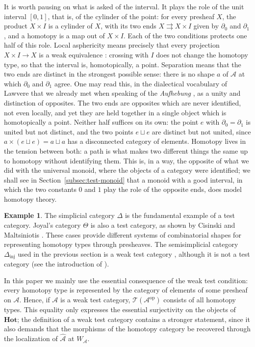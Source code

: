 \documentclass[11pt]{amsart}
\theoremstyle{definition}
\newtheorem{example}[teo]{Example}
\theoremstyle{remark}
\numberwithin{figure}{section}%
\newcommand{\T}{\mathcal{T}}
\newcommand{\Hot}{\mathbf{Hot}}
\newcommand{\Dinj}{\Delta_{\mathrm{inj}}}
\newcommand{\op}{\mathrm{op}}
\newcommand{\A}{\mathcal{A}}
\begin{document}
It is worth pausing on what is asked of the interval. It plays the role of the unit interval $[0,1]$, that is, of the cylinder of the point: for every presheaf $X$, the product $X\times I$ is a cylinder of $X$, with its two ends $X\rightrightarrows X\times I$ given by $\partial_0$ and $\partial_1$, and a homotopy is a map out of $X\times I$. Each of the two conditions protects one half of this role. Local asphericity means precisely that every projection $X\times I\to X$ is a weak equivalence \cite[1.2.6]{Malt}: crossing with $I$ does not change the homotopy type, so that the interval is, homotopically, a point. Separation means that the two ends are distinct in the strongest possible sense: there is no shape $a$ of $\A$ at which $\partial_0$ and $\partial_1$ agree. One may read this, in the dialectical vocabulary of Lawvere that we already met when speaking of the \emph{Aufhebung} \cite{LawvereFutureCategoryTheory}, as a unity and distinction of opposites. The two ends are opposites which are never identified, not even locally, and yet they are held together in a single object which is homotopically a point. Neither half suffices on its own: the point $e$ with $\partial_0=\partial_1$ is united but not distinct, and the two points $e\sqcup e$ are distinct but not united, since $a\times(e\sqcup e)=a\sqcup a$ has a disconnected category of elements. Homotopy lives in the tension between both: a path is what makes two different things the same up to homotopy without identifying them. This is, in a way, the opposite of what we did with the universal monoid, where the objects of a category were identified; we shall see in Section~\ref{subsec:test-monoid} that a monoid with a good interval, in which the two constants $0$ and $1$ play the role of the opposite ends, does model homotopy theory.

\begin{example}
The simplicial category $\Delta$ is the fundamental example of a test category. Joyal's category $\Theta$ is also a test category, as shown by Cisinski and Maltsiniotis \cite{CM}. These cases provide different systems of combinatorial shapes for representing homotopy types through presheaves. The semisimplicial category $\Dinj$ used in the previous section is a weak test category \cite[Prop.~1.7.25]{Malt}, although it is not a test category (see the introduction of \cite{Malt}).
\end{example}

In this paper we mainly use the essential consequence of the weak test condition: every homotopy type is represented by the category of elements of some presheaf on $\A$. Hence, if $\A$ is a weak test category, $\T(\A^{\op})$ consists of all homotopy types. This equality only expresses the essential surjectivity on the objects of $\Hot$; the definition of a weak test category contains a stronger statement, since it also demands that the morphisms of the homotopy category be recovered through the localization of $\widehat{\A}$ at $W_\A$.
\end{document}
